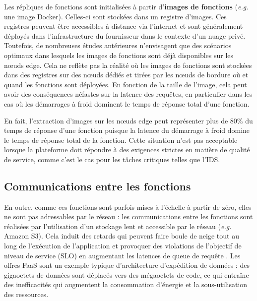 Les répliques de fonctions sont initialisées à partir d'\textbf{images de fonctions} (\textit{e.g.} une image Docker). Celles-ci sont stockées dans un registre d'images. Ces registres peuvent être accessibles à distance via l'internet et sont généralement déployés dans l'infrastructure du fournisseur dans le contexte d'un nuage privé. Toutefois, de nombreuses études antérieures \cite{bhasiCypressInputSizesensitive2022, zijunFassflowEfficient2022, smithFaDOFaaSFunctions2022, zhangFIRSTExploitingMultiDimensional2023} n'envisagent que des scénarios optimaux dans lesquels les images de fonctions sont déjà disponibles sur les nœuds edge. Cela ne reflète pas la réalité où les images de fonctions sont stockées dans des registres sur des nœuds dédiés et tirées par les nœuds de bordure où et quand les fonctions sont déployées. En fonction de la taille de l'image, cela peut avoir des conséquences néfastes sur la latence des requêtes, en particulier dans les cas où les démarrages à froid dominent le temps de réponse total d'une fonction.

En fait, l'extraction d'images sur les nœuds edge peut représenter plus de 80\% du temps de réponse d'une fonction \cite{yanHermesEfficientCache2020} puisque la latence du démarrage à froid domine le temps de réponse total de la fonction. Cette situation n'est pas acceptable lorsque la plateforme doit répondre à des exigences strictes en matière de qualité de service, comme c'est le cas pour les tâches critiques telles que l'IDS.

\subsection{Communications entre les fonctions}
\label{section:herocache-background-communications}

En outre, comme ces fonctions sont parfois mises à l'échelle à partir de zéro, elles ne sont pas adressables par le réseau : les communications entre les fonctions sont réalisées par l'utilisation d'un stockage lent et accessible par le réseau (\textit{e.g.} Amazon S3). Cela induit des retards qui peuvent faire boule de neige tout au long de l'exécution de l'application et provoquer des violations de l'objectif de niveau de service (SLO) en augmentant les latences de queue de requête \cite{wawrzoniakBoxerDataAnalytics2021a}. Les offres FaaS sont un exemple typique d'architecture d'expédition de données : des gigaoctets de données sont déplacés vers des mégaoctets de code, ce qui entraîne des inefficacités qui augmentent la consommation d'énergie et la sous-utilisation des ressources.

